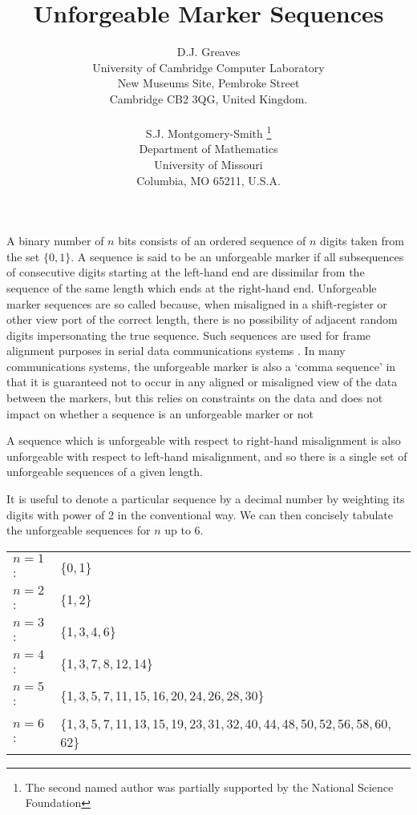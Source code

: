 \documentclass[12pt]{article}
\begin{document}
\title{Unforgeable Marker Sequences}

\author{
D.J. Greaves\\
University of Cambridge Computer Laboratory\\
New Museums Site, Pembroke Street\\
Cambridge CB2 3QG, United Kingdom.\\
\\
S.J. Montgomery-Smith%
\thanks{The second named author was partially supported by the National
Science Foundation}\\
Department of Mathematics\\
University of Missouri\\
Columbia, MO 65211, U.S.A.}

\date{}

\maketitle

A binary number of $n$ bits consists of an ordered sequence of $n$
digits taken from the set $\{0, 1 \}$.  A sequence is said to be an
unforgeable marker if all subsequences of consecutive digits starting
at the left-hand end are dissimilar from the sequence of the same
length which ends at the right-hand end.  Unforgeable marker sequences
are so called because, when misaligned in a shift-register or other
view port of the correct length, there is no possibility of adjacent
random digits impersonating the true sequence.  Such sequences are
used for frame alignment purposes in serial data communications
systems \cite{dig}. In many communications systems, the unforgeable marker is
also a `comma sequence' in that it is guaranteed not to occur in any
aligned or misaligned view of the data between the markers, but this
relies on constraints on the data and does not impact on whether a
sequence is an unforgeable marker or not

A sequence which is unforgeable with respect to right-hand misalignment
is also unforgeable with respect to left-hand misalignment, and so
there is a single set of unforgeable sequences of a given length. 

It is useful to denote a particular sequence by a decimal number
by weighting its digits with power of 2 in the conventional way.
We can then concisely tabulate the unforgeable sequences for $n$ up to 6.

\begin{tabular}{ll}
$n = 1$: & \{0,\,1\}\\
$n = 2$: & \{1,\,2\}\\
$n = 3$: & \{1,\,3,\,4,\,6\}\\
$n = 4$: & \{1,\,3,\,7,\,8,\,12,\,14\}\\
$n = 5$: & \{1,\,3,\,5,\,7,\,11,\,15,\,16,\,20,\,24,\,26,\,28,\,30\}\\
$n = 6$: & \{1,\,3,\,5,\,7,\,11,\,13,\,15,\,19,\,23,\,31,\,32,\,40,\,44,\,48,\,50,\,52,\,56,\,58,\,60,\,62\}\\
\end{tabular}
\end{document}
